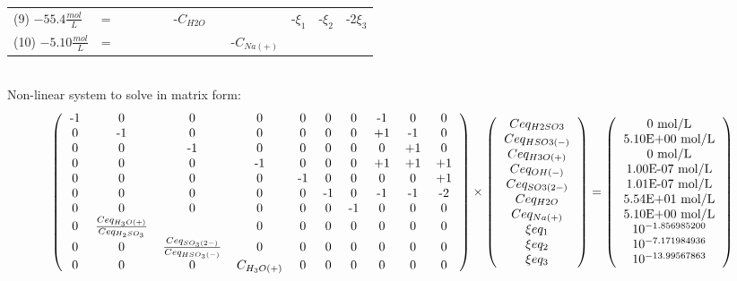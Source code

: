 \documentclass[6pt,a4paper,oneside,preview]{standalone}
\begin{document}
\begin{landscape}
\begin{tabular}{llllllllllll}
(9) $-55.4 \frac{mol}{L}$  &= &  &  &  &  & -$C_{H2O}$  &  &  & -$\xi_1$ & -$\xi_2$ & -2$\xi_3$ \\
(10) $-5.10\frac{mol}{L}$ &= &  &  &  &  &  &  & -$C_{Na(+)}$ &  &  & \\
\end{tabular} 
\\
Non-linear system to solve in matrix form:
\\
\[
\left(
\begin{tabular}{cccccccccc}
-1 & 0 & 0 & 0 & 0 & 0 & 0 & -1 & 0 & 0 \\
0 & -1 & 0 & 0 & 0 & 0 & 0 & +1 & -1 & 0 \\
0 & 0 & -1 & 0 & 0 & 0 & 0 & 0 & +1 & 0 \\
0 & 0 & 0 & -1 & 0 & 0 & 0 & +1 & +1 & +1 \\
0 & 0 & 0 & 0 & -1 & 0 & 0 & 0 & 0 & +1 \\
0 & 0 & 0 & 0 & 0 & -1 & 0 & -1 & -1 & -2 \\
0 & 0 & 0 & 0 & 0 & 0 & -1 & 0 & 0 & 0 \\
0 & $\frac{Ceq_{H_3O(+)}}{Ceq_{H_2SO_3}}$ &  
& 0 & 0 & 0 & 0 & 0 & 0 & 0 \\
0 & 0 & $\frac{Ceq_{SO_3(2-)}}{Ceq_{HSO_3(-)}}$ & 
0 & 0 & 0 & 0 & 0 & 0 & 0\\
0 & 0 & 0 & $C_{H_3O(+)}$ & 0 & 0 & 0 & 0 & 0 & 0
\end{tabular}
\right)
\times
\left(
\begin{tabular}{c}
$Ceq_{H2SO3}$ \\
$Ceq_{HSO3(-)}$ \\
$Ceq_{H3O(+)}$ \\
$Ceq_{OH(-)}$ \\
$Ceq_{SO3(2-)}$ \\
$Ceq_{H2O}$ \\
$Ceq_{Na(+)}$ \\
$\xi eq_1$ \\
$\xi eq_2$ \\
$\xi eq_3$ \\
\end{tabular}
\right)
=
\left(
\begin{tabular}{c}
0 mol/L\\ 
5.10E+00 mol/L \\ 
0 mol/L \\ 
1.00E-07 mol/L \\ 
1.01E-07 mol/L \\ 
5.54E+01 mol/L \\ 
5.10E+00 mol/L \\ 
$10^{-1.856985200}$ \\
$10^{-7.171984936}$ \\
$10^{-13.99567863}$ \\
\end{tabular}
\right)
\]
\\ 
\end{landscape}
\end{document}
